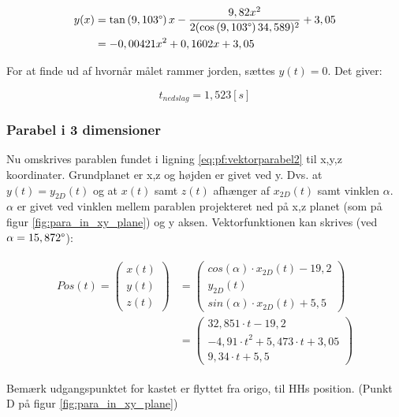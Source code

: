 \begin{align}
\begin{split}
y(x) &= \tan \left(9,103 \degree \right) x - \frac{9,82x^2}{2(\cos \left(9,103 \degree \right) 34,589)^2} + 3,05 \\
&= - 0,00421 x^2 + 0,1602 x  + 3,05
\label{eq:pf:y(x)3}
\end{split}
\end{align}

For at finde ud af hvornår målet rammer jorden, sættes \(y(t) = 0\). Det giver:

\begin{equation}
t_{nedslag} = 1,523 [s]
\label{eq:pf:nedslagstid}
\end{equation}

\subsubsection{Parabel i 3 dimensioner}
\label{subsubsec:para}
Nu omskrives parablen fundet i ligning \ref{eq:pf:vektorparabel2} til x,y,z koordinater. 
Grundplanet er x,z og højden er givet ved y. Dvs. at \(y(t) = y_{2D}(t)\) og at \(x(t)\) samt \(z(t)\) afhænger af \(x_{2D}(t)\) samt vinklen \(\alpha\). 
\(\alpha\) er givet ved vinklen mellem parablen projekteret ned på x,z planet (som på figur \ref{fig:para_in_xy_plane}) og y aksen. 
Vektorfunktionen kan skrives (ved \(\alpha = 15,872 \degree\)): 

\begin{align}
\begin{split}
Pos\left( t \right) = \left( \begin{matrix} x\left( t \right)  \\ y\left( t \right)  \\ z\left( t \right)  \end{matrix} \right) &=\left( \begin{matrix} cos\left( \alpha  \right) \cdot { x }_{ 2D }\left( t \right) -19,2 \\ { y }_{ 2D }\left( t \right)  \\ sin\left( \alpha  \right) \cdot { x }_{ 2D }\left( t \right) +5,5 \end{matrix} \right) 
\\
&= \left( \begin{matrix} 32,851\cdot t-19,2 \\ -{ 4,91\cdot t }^{ 2 }+5,473\cdot t+3,05 \\ 9,34\cdot t+5,5 \end{matrix} \right) 
\label{eq:pf:vektorparabel3d}
\end{split}
\end{align}





Bemærk udgangspunktet for kastet er flyttet fra origo, til HHs position. (Punkt D på figur \ref{fig:para_in_xy_plane})
